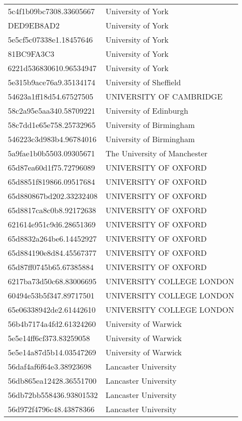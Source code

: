 \begin{tabular}{ll}
5c4f1b09bc7308.33605667 & University of York \\
DED9EB8AD2 & University of York \\
5e5cf5c07338e1.18457646 & University of York \\
81BC9FA3C3 & University of York \\
6221d536830610.96534947 & University of York \\
5e315b9ace76a9.35134174 & University of Sheffield \\
54623a1ff18d54.67527505 & UNIVERSITY OF CAMBRIDGE \\
58c2a95e5aa340.58709221 & University of Edinburgh \\
58c7dd1e65e758.25732965 & University of Birmingham \\
546223c3d983b4.96784016 & University of Birmingham \\
5a9fae1b0b5503.09305671 & The University of Manchester \\
65d87ea60d1f75.72796089 & UNIVERSITY OF OXFORD \\
65d8851f819866.09517684 & UNIVERSITY OF OXFORD \\
65d880867bd202.33232408 & UNIVERSITY OF OXFORD \\
65d8817ca8c0b8.92172638 & UNIVERSITY OF OXFORD \\
621614e951c9d6.28651369 & UNIVERSITY OF OXFORD \\
65d8832a264be6.14452927 & UNIVERSITY OF OXFORD \\
65d884190e8d84.45567377 & UNIVERSITY OF OXFORD \\
65d87ff0745b65.67385884 & UNIVERSITY OF OXFORD \\
6217ba73d50c68.83006695 & UNIVERSITY COLLEGE LONDON \\
60494e53b5f347.89717501 & UNIVERSITY COLLEGE LONDON \\
65e06338942de2.61442610 & UNIVERSITY COLLEGE LONDON \\
56b4b7174a4fd2.61324260 & University of Warwick \\
5e5e14ff6cf373.83259058 & University of Warwick \\
5e5e14a87d5b14.03547269 & University of Warwick \\
56daf4af6f64e3.38923698 & Lancaster University \\
56db865ea12428.36551700 & Lancaster University \\
56db72bb558436.93801532 & Lancaster University \\
56d972f4796c48.43878366 & Lancaster University \\

\end{tabular}
